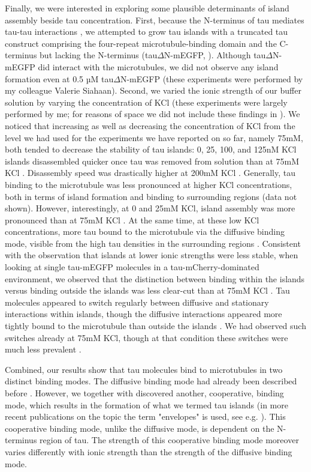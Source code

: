 Finally, we were interested in exploring some plausible determinants of island assembly beside tau concentration. First, because the N-terminus of tau mediates tau-tau interactions \parencite{Gamblin2003}, we attempted to grow tau islands with a truncated tau construct comprising the four-repeat microtubule-binding domain and the C-terminus but lacking the N-terminus (tau$\Delta$N-mEGFP, ). Although tau$\Delta$N-mEGFP did interact with the microtubules, we did not observe any island formation even at 0.5 µM tau$\Delta$N-mEGFP (these experiments were performed by my colleague Valerie Siahaan). Second, we varied the ionic strength of our buffer solution by varying the concentration of KCl (these experiments were largely performed by me; for reasons of space we did not include these findings in \cite{Siahaan2019a}). We noticed that increasing as well as decreasing the concentration of KCl from the level we had used for the experiments we have reported on so far, namely 75mM, both tended to decrease the stability of tau islands: 0, 25, 100, and 125nM KCl islands disassembled quicker once tau was removed from solution than at 75mM KCl . Disassembly speed was drastically higher at 200mM KCl . Generally, tau binding to the microtubule was less pronounced at higher KCl concentrations, both in terms of island formation and binding to surrounding regions (data not shown). However, interestingly, at 0 and 25mM KCl, island assembly was more pronounced than at 75mM KCl . At the same time, at these low KCl concentrations, more tau bound to the microtubule via the diffusive binding mode, visible from the high tau densities in the surrounding regions . Consistent with the observation that islands at lower ionic strengths were less stable, when looking at single tau-mEGFP molecules in a tau-mCherry-dominated environment, we observed that the distinction between binding within the islands versus binding outside the islands was less clear-cut than at 75mM KCl . Tau molecules appeared to switch regularly between diffusive and stationary interactions within islands, though the diffusive interactions appeared more tightly bound to the microtubule than outside the islands . We had observed such switches already at 75mM KCl, though at that condition these switches were much less prevalent .\par

Combined, our results show that tau molecules bind to microtubules in two distinct binding modes. The diffusive binding mode had already been described before \parencite{Hinrichs2012b}. However, we together with \cite{tan2019microtubules} discovered another, cooperative, binding mode, which results in the formation of what we termed tau islands (in more recent publications on the topic the term "envelopes" is used, see e.g. \cite{siahaan2022microtubule}). This cooperative binding mode, unlike the diffusive mode, is dependent on the N-terminus region of tau. The strength of this cooperative binding mode moreover varies differently with ionic strength than the strength of the diffusive binding mode.